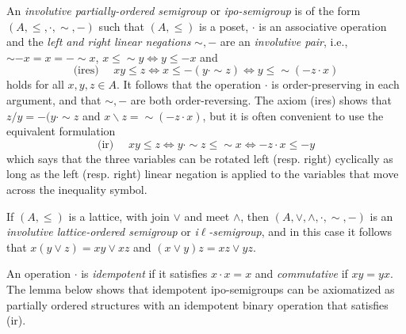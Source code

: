 \documentclass[12pt]{amsart}
\newcommand{\ld}{{\backslash}}
\renewcommand{\ln}{{\sim}}
\newcommand{\rn}{{-}}
\begin{document}
An \emph{involutive partially-ordered semigroup} or \emph{ipo-semigroup} is of the form $(A,\le,\cdot,\ln,\rn)$ such that $(A,\le)$ is a poset, $\cdot$ is an associative operation and the \emph{left and right linear negations} $\sim,-$ are an \emph{involutive pair}, i.e., $\ln\rn x=x=\rn\ln x$, $x\le \ln y\iff y\le\rn x$ and
$$
\text{(ires) }\quad xy\le z\iff x\le \rn(y\cdot\ln z)\iff y\le \ln(\rn z\cdot x)
$$
holds for all $x,y,z\in A$.
It follows that the operation $\cdot$ is order-preserving in each argument, and that $\ln,\rn$ are both order-reversing. The axiom (ires) shows that $z/y=\rn(y\cdot \ln z$ and $x\ld z=\ln(\rn z\cdot x)$, but it is often convenient to use the equivalent formulation
$$
\text{(ir) }\quad xy\le z\iff y\cdot\ln z\le \ln x\iff \rn z\cdot x\le \rn y
$$
which says that the three variables can be rotated left (resp. right) cyclically as long as the left (resp. right) linear negation is applied to the variables that move across the inequality symbol.

If $(A,\le)$ is a lattice, with join $\vee$ and meet $\wedge$, then $(A,\vee,\wedge,\cdot,\sim,-)$ is an \emph{involutive lattice-ordered semigroup} or \emph{i$\ell$-semigroup}, and in this case it follows that $x(y\vee z)=xy\vee xz$ and $(x\vee y)z=xz\vee yz$.

An operation $\cdot$ is \emph{idempotent} if it satisfies $x\cdot x=x$ and
\emph{commutative} if $xy=yx$. The lemma below shows that idempotent ipo-semigroups can be axiomatized as partially ordered structures with an idempotent binary operation that satisfies (ir).
\end{document}
